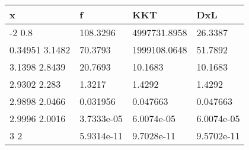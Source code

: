 \begin{tabular}{llll}
x & f & KKT & DxL \\ 
\hline 
-2         0.8 & 108.3296 & 4997731.8958 & 26.3387 \\ 
0.34951      3.1482 & 70.3793 & 1999108.0648 & 51.7892 \\ 
3.1398      2.8439 & 20.7693 & 10.1683 & 10.1683 \\ 
2.9302       2.283 & 1.3217 & 1.4292 & 1.4292 \\ 
2.9898      2.0466 & 0.031956 & 0.047663 & 0.047663 \\ 
2.9996      2.0016 & 3.7333e-05 & 6.0074e-05 & 6.0074e-05 \\ 
3           2 & 5.9314e-11 & 9.7028e-11 & 9.5702e-11 \\ 
\hline 
\end{tabular}